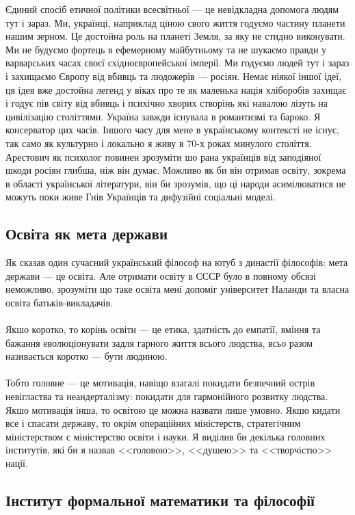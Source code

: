 Єдиний спосіб етичної політики всесвітньої --- це невідкладна допомога людям тут і
зараз. Ми, українці, наприклад ціною свого життя годуємо частину планети нашим
зерном. Це достойна роль на планеті Земля, за яку не стидно виконувати. Ми не
будуємо фортець в ефемерному майбутньому та не шукаємо правди у варварських
часах своєї східноєвропейської імперії. Ми годуємо людей тут і зараз і захищаємо
Європу від вбивць та людожерів --- росіян. Немає ніякої іншої ідеї, ця ідея вже
достойна легенд у віках про те як маленька нація хліборобів захищає і годує пів
світу від вбивць і психічно хворих створінь які навалою лізуть на цивілізацію
століттями. Україна завжди існувала в романтизмі та бароко. Я консерватор цих
часів. Іншого часу для мене в українському контексті не існує, так само як
культурно і локально я живу в 70-х роках минулого століття. Арестович як психолог
повинен зрозуміти шо рана українців від заподіяної шкоди росіян глибша, ніж він думає.
Можливо як би він отримав освіту, зокрема в області української літератури,
він би зрозумів, що ці народи асимілюватися не можуть поки живе Гнів Українців
та дифузійні соціальні моделі.

\subsection{Освіта як мета держави}

Як сказав один сучасний український філософ на ютуб з династії філософів:
мета держави --- це освіта. Але отримати освіту в СССР було в повному обсязі
неможливо, зрозуміти що таке освіта мені допоміг університет Наланди та
власна освіта батьків-викладачів.
\\
\\
Якшо коротко, то корінь освіти --- це етика, здатність до емпатії, вміння та бажання
еволюціонувати задля гарного життя всього людства, всьо разом називається
коротко --- бути людиною.
\\
\\
Тобто головне --- це мотивація, навіщо взагалі покидати безпечний острів невігластва
та неандерталізму: покидати для гармонійного розвитку людства. Якшо мотивація інша,
то освітою це можна назвати лише умовно. Якшо кидати все і спасати державу, то окрім
операційних міністерств, стратегічним міністерством є міністерство освіти і науки.
Я виділив би декілька головних інститутів, які би я назвав <<головою>>, <<душею>> та <<творчістю>> нації.

\subsection{Інститут формальної математики та філософії}

